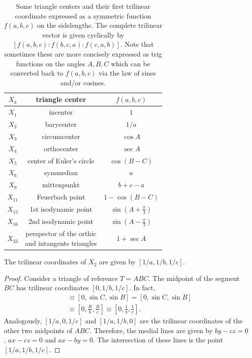 \begin{table}[H]
    \centering
    \begin{tabular}{|c|c|c|}
    \hline
         $X_k $& triangle center& $f(a,b,c)$ \\
         \hline
     $X_1 $ & incenter & $ 1$ \\
     \hline
          $X_2 $ & barycenter  & ${1}/{a}$ \\
          \hline
              $X_3$ & circumcenter & $\cos A$ \\
              \hline 
              $ X_4$ & orthocenter & $\sec A$ \\
              \hline   
                $X_5$ & center of Euler's circle & $\cos(B - C)$ \\
              \hline  
                $X_6$ & symmedian & $a$ \\
              \hline  
              $X_9$ & mittenpunkt & $b + c - a$ \\
              \hline
                 $X_{11}$ &Feuerbach point  & $1 - \cos(B - C)$ \\
              \hline
               $X_{15}$ & 1st isodynamic point   & $\sin(A+\frac{\pi}{3})$ \\
              \hline
                $ X_{16} $ & 2nd isodynamic point   & $\sin(A-\frac{\pi}{3})$ \\
              \hline
               $X_{33}$ &  \makecell[cc]{perspector of the orthic\\and intangents triangles}  & $1 +\sec{A}$ \\
            \hline
    \end{tabular}
    \caption{Some triangle centers and their first trilinear coordinate expressed as a symmetric function $f(a,b,c)$ on the sidelengths. The complete trilinear vector is given cyclically by $[f(a,b,c):f(b,c,a):f(c,a,b)]$. Note that sometimes these are more concisely expressed as trig functions on the angles $A,B,C$ which can be converted back to $f(a,b,c)$ via the law of sines and/or cosines.}
    \label{tab:Xitrilinear}
\end{table}

\begin{proposition}
The trilinear coordinates of $X_2$ are given by $[1/a,1/b,1/c].$
\end{proposition}

\begin{proof}
Consider a triangle of reference $T=ABC$. The midpoint of the segment $BC$ has trilinear coordinates $[0,1/b,1/c].$
In fact,
\begin{align*}
    [0,\frac{a}{2}\sin C, \frac{a}{2}\sin B] &\equiv[0,\sin C,\sin B]=[0,\sin C,\sin B]\\
    &\equiv[0,\frac{R}{b},\frac{R}{c}]\equiv [0,\frac{1}{b},\frac{1}{c}].
\end{align*} 
Analogously, $[1/a,0,1/c]$ and $[1/a,1/b,0]$ are the trilinear coordinates of the other two midpoints of $ABC.$
Therefore, the medial lines are given by $by-cz=0$, $ax-cz=0$ and $ax-by=0$. The intersection of these lines is the point $[1/a,1/b,1/c].$
\end{proof}

